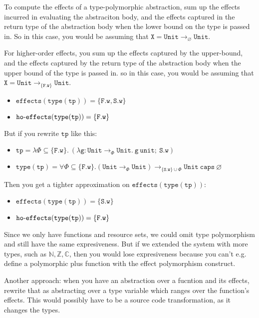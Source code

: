 \documentclass{llncs}
\newcommand{\keywadj}[1]{\mathtt{#1}}
\newcommand{\kwa}[1]{\keywadj{ #1 }}
\newcommand{\hyphen}{\hbox{-}}
\newcommand{\fx}[1]{ \kwa{effects}(#1) }
\newcommand{\hofx}[1]{ \kwa{ho \hyphen effects}(#1) }
\begin{document}
\noindent
To compute the effects of a type-polymorphic abstraction, sum up the effects incurred in evaluating the abstraciton body, and the effects captured in the return type of the abstraction body when the lower bound on the type is passed in. So in this case, you would be assuming that $\kwa{X = Unit \rightarrow_{\varnothing} Unit}$.

For higher-order effects, you sum up the effects captured by the upper-bound, and the effects captured by the return type of the abstraction body when the upper bound of the type is passed in. so in this case, you would be assuming that $\kwa{X = Unit \rightarrow_{\kwa{\{F.w\}}} Unit}$.

\begin{itemize}
	\item $\fx{\kwa{type(tp)}} = \{ \kwa{F.w, S.w} \}$
	\item $\hofx{\kwa{type(tp)}} = \{ \kwa{F.w} \}$
\end{itemize}

\noindent
But if you rewrite $\kwa{tp}$ like this:

\begin{itemize}
	\item $\kwa{tp = \lambda \Phi \subseteq \{\kwa{F.w}\}.~(\lambda g: Unit \rightarrow_{\Phi} Unit. ~g~unit;~S.w)}$
	\item $\kwa{type(tp) = \forall \Phi \subseteq \{\kwa{F.w}\}. (Unit \rightarrow_{\Phi} Unit) \rightarrow_{\{\kwa{S.w}\} \cup \Phi} Unit~caps~\varnothing}$
\end{itemize}

\noindent
Then you get a tighter approximation on $\kwa{effects(type(tp))}$:

\begin{itemize}
	\item $\fx{\kwa{type(tp)}} = \{ \kwa{S.w} \}$
	\item $\hofx{\kwa{type(tp)}} = \{ \kwa{F.w} \}$
\end{itemize}

\noindent
Since we only have functions and resource sets, we could omit type polymorphism and still have the same expresiveness. But if we extended the system with more types, such as $\mathbb{N, Z, C}$, then you would lose expresiveness because you can't e.g. define a polymorphic plus function with the effect polymorphism construct.

Another approach: when you have an abstraction over a fucntion and its effects, rewrite that as abstracting over a type variable which ranges over the function's effects. This would possibly have to be a source code transformation, as it changes the types.
\end{document}
